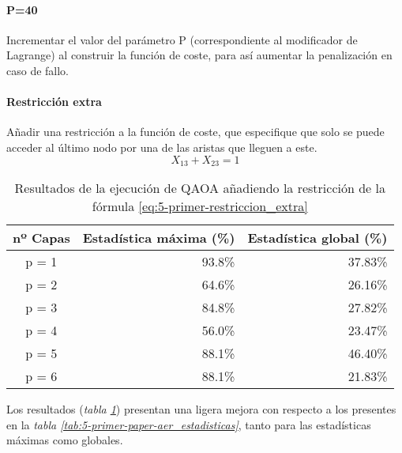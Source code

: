 \documentclass{article}
\begin{document}
\paragraph{P=40}
Incrementar el valor del parámetro P (correspondiente al modificador de Lagrange)
al construir la función de coste, para así aumentar la penalización en caso de fallo.

\paragraph{Restricción extra}
Añadir una restricción a la función de coste, que especifique que solo se puede acceder al último nodo por una de las aristas que lleguen a este.
\begin{equation}
  \label{eq:5-primer-restriccion_extra}
  X_{13} + X_{23} = 1
\end{equation}

\begin{table}[htbp]
  \centering
  \begin{tabular}{|c|r|r|}
    \hline
    \textbf{nº Capas} & \textbf{Estadística máxima (\%)} & \textbf{Estadística global (\%)} \\ \hline
    p = 1 & 93.8\% & 37.83\% \\ \hline
    p = 2 & 64.6\% & 26.16\% \\ \hline
    p = 3 & 84.8\% & 27.82\% \\ \hline
    p = 4 & 56.0\% & 23.47\% \\ \hline
    p = 5 & 88.1\% & 46.40\% \\ \hline
    p = 6 & 88.1\% & 21.83\% \\ \hline
  \end{tabular}
  \caption{Resultados de la ejecución de QAOA añadiendo la restricción de la fórmula \ref{eq:5-primer-restriccion_extra}}
  \label{tab:5-primer-restriccion_extra-aer_estadisticas}
\end{table}

Los resultados (\textit{tabla \ref{tab:5-primer-restriccion_extra-aer_estadisticas}}) presentan una ligera mejora con respecto a los presentes en la \textit{tabla \ref{tab:5-primer-paper-aer_estadisticas}}, tanto para las estadísticas máximas como globales. \\
\end{document}
